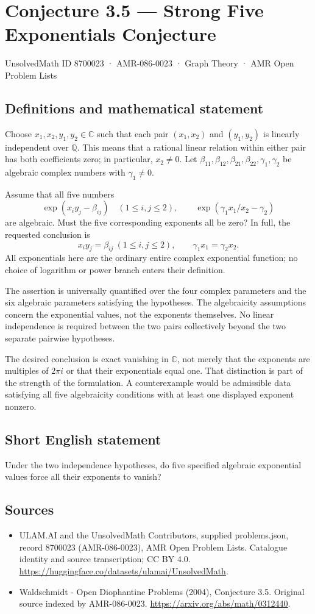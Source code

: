 \documentclass[11pt,a4paper]{article}
\begin{document}
\section*{Conjecture 3.5 — Strong Five Exponentials Conjecture}\label{8700023}
{\small UnsolvedMath ID 8700023 · AMR-086-0023 · Graph Theory · AMR Open Problem Lists}
\subsection{Definitions and mathematical statement}
Choose $x_1,x_2,y_1,y_2\in\mathbb C$ such that each pair $(x_1,x_2)$ and $(y_1,y_2)$ is linearly independent over $\mathbb Q$. This means that a rational linear relation within either pair has both coefficients zero; in particular, $x_2\ne0$. Let $\beta_{11},\beta_{12},\beta_{21},\beta_{22},\gamma_1,\gamma_2$ be algebraic complex numbers with $\gamma_1\ne0$.

Assume that all five numbers
\[
\exp(x_i y_j-\beta_{ij})\quad(1\le i,j\le2),
\qquad \exp(\gamma_1x_1/x_2-\gamma_2)
\]
are algebraic. Must the five corresponding exponents all be zero? In full, the requested conclusion is
\[
x_i y_j=\beta_{ij}\ (1\le i,j\le2),\qquad
\gamma_1x_1=\gamma_2x_2.
\]
All exponentials here are the ordinary entire complex exponential function; no choice of logarithm or power branch enters their definition.

The assertion is universally quantified over the four complex parameters and the six algebraic parameters satisfying the hypotheses. The algebraicity assumptions concern the exponential values, not the exponents themselves. No linear independence is required between the two pairs collectively beyond the two separate pairwise hypotheses.

The desired conclusion is exact vanishing in $\mathbb C$, not merely that the exponents are multiples of $2\pi i$ or that their exponentials equal one. That distinction is part of the strength of the formulation. A counterexample would be admissible data satisfying all five algebraicity conditions with at least one displayed exponent nonzero.
\subsection{Short English statement}
Under the two independence hypotheses, do five specified algebraic exponential values force all their exponents to vanish?
\subsection{Sources}
\begin{itemize}
\item[S1] ULAM.AI and the UnsolvedMath Contributors, supplied problems.json, record 8700023 (AMR-086-0023), AMR Open Problem Lists. Catalogue identity and source transcription; CC BY 4.0.
\url{https://huggingface.co/datasets/ulamai/UnsolvedMath}.
\item[S2] Waldschmidt - Open Diophantine Problems (2004), Conjecture 3.5. Original source indexed by AMR-086-0023.
\url{https://arxiv.org/abs/math/0312440}.
\end{itemize}
\end{document}
